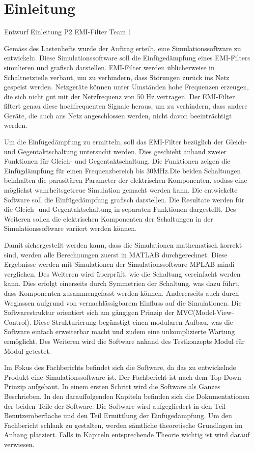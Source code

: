 \section{Einleitung} \label{sec:einleitung}
Entwurf Einleitung P2 EMI-Filter Team 1

Gemäss des Lastenhefts wurde der Auftrag erteilt, eine Simulationssoftware zu entwickeln. Diese Simulationssoftware soll die Einfügedämpfung eines EMI-Filters simulieren und grafisch darstellen. EMI-Filter werden üblicherweise in Schaltnetzteile verbaut, um zu verhindern, dass Störungen zurück ins Netz gespeist werden. Netzgeräte können unter Umständen hohe Frequenzen erzeugen, die sich nicht gut mit der Netzfrequenz von 50 Hz vertragen. Der EMI-Filter filtert genau diese hochfrequenten Signale heraus, um zu verhindern, dass andere Geräte, die auch ans Netz angeschlossen werden, nicht davon beeinträchtigt werden.

Um die Einfügedämpfung zu ermitteln, soll das EMI-Filter bezüglich der Gleich- und Gegentaktschaltung untersucht werden. Dies geschieht anhand zweier Funktionen für Gleich- und Gegentaktschaltung. Die Funktionen zeigen die Einfügdämpfung für einen Frequenzbereich bis 30MHz.Die beiden Schaltungen beinhalten die parasitären Parameter der elektrischen Komponenten, sodass eine möglichst wahrheitsgetreue Simulation gemacht werden kann. Die entwickelte Software soll die Einfügedämpfung grafisch darstellen.  Die Resultate werden für die Gleich- und Gegentaktschaltung in separaten Funktionen dargestellt. Des Weiteren sollen die elektrischen Komponenten der Schaltungen in der Simulationssoftware variiert werden können.
 
Damit sichergestellt werden kann, dass die Simulationen mathematisch korrekt sind, werden alle Berechnungen zuerst in MATLAB durchgerechnet. Diese Ergebnisse werden mit Simulationen der Simulationssoftware MPLAB mindi verglichen. Des Weiteren wird überprüft, wie die Schaltung vereinfacht werden kann. Dies erfolgt einerseits durch Symmetrien der Schaltung, was dazu führt, dass Komponenten zusammengefasst werden können. Andererseits auch durch Weglassen aufgrund von vernachlässigbarem Einfluss auf die Simulationen. Die Softwarestruktur orientiert sich am gängigen Prinzip der MVC(Model-View-Control). Diese Strukturierung begünstigt einen modularen Aufbau, was die Software einfach erweiterbar macht und zudem eine unkomplizierte Wartung ermöglicht. Des Weiteren wird die Software anhand des Testkonzepts Modul für Modul getestet.

Im Fokus des Fachberichts befindet sich die Software, da das zu entwickelnde Produkt eine Simulationssoftware ist. Der Fachbericht ist nach dem Top-Down-Prinzip aufgebaut. In einem ersten Schritt wird die Software als Ganzes Beschrieben. In den darauffolgenden Kapiteln befinden sich die Dokumentationen der beiden Teile der Software. Die Software wird aufgegliedert in den Teil Benutzeroberfläche und den Teil Ermittlung der Einfügedämpfung. Um den Fachbericht schlank zu gestalten, werden sämtliche theoretische Grundlagen im Anhang platziert. Falls in Kapiteln entsprechende Theorie wichtig ist wird darauf verwiesen.

